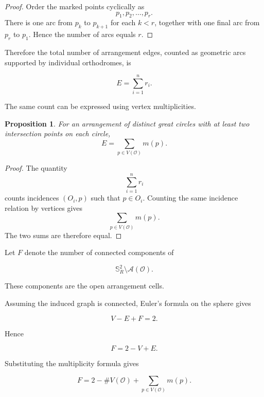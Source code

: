 \documentclass[11pt,fleqn]{book}
\numberwithin{equation}{chapter}
\theoremstyle{plain}
\newtheorem{proposition}[theorem]{Proposition}
\theoremstyle{definition}
\theoremstyle{remark}
\newcommand{\Sphere}{\mathbb{S}^{2}}
\newcommand{\Oset}{\mathcal{O}}
\begin{document}
\begin{proof}
Order the marked points cyclically as
\[
p_1,p_2,\dots,p_r.
\]
There is one arc from \(p_k\) to \(p_{k+1}\) for each \(k<r\), together with one final arc from \(p_r\) to \(p_1\). Hence the number of arcs equals \(r\).
\end{proof}

Therefore the total number of arrangement edges, counted as geometric arcs supported by individual orthodromes, is

\begin{equation}
    E
    =
    \sum_{i=1}^{n}r_i.
\end{equation}

The same count can be expressed using vertex multiplicities.

\begin{proposition}
For an arrangement of distinct great circles with at least two intersection points on each circle,
\[
E
=
\sum_{p\in V(\Oset)}m(p).
\]
\end{proposition}

\begin{proof}
The quantity
\[
\sum_{i=1}^{n}r_i
\]
counts incidences \((O_i,p)\) such that \(p\in O_i\). Counting the same incidence relation by vertices gives
\[
\sum_{p\in V(\Oset)}m(p).
\]
The two sums are therefore equal.
\end{proof}

Let \(F\) denote the number of connected components of

\begin{equation}
    \Sphere_R\setminus \mathscr{A}(\Oset).
\end{equation}

These components are the open arrangement cells.

Assuming the induced graph is connected, Euler's formula on the sphere gives

\begin{equation}
    V-E+F=2.
\end{equation}

Hence

\begin{equation}
    F=2-V+E.
\end{equation}

Substituting the multiplicity formula gives

\begin{equation}
    F
    =
    2
    -
    \#V(\Oset)
    +
    \sum_{p\in V(\Oset)}m(p).
\end{equation}
\end{document}
